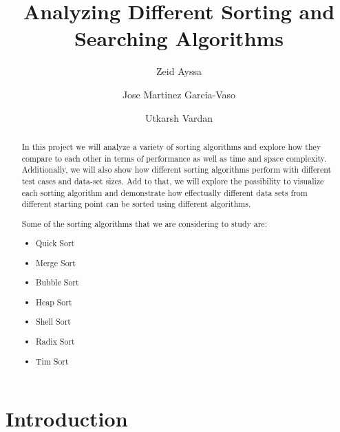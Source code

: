 \documentclass[sigconf,table]{acmart}
\begin{document}
\title{Analyzing Different Sorting and Searching Algorithms}

\author{Zeid Ayssa}

\author{Jose Martinez Garcia-Vaso}

\author{Utkarsh Vardan}

\begin{abstract}
In this project we will analyze a variety of sorting algorithms and explore how they compare to each other in terms of performance as well as time and space complexity. Additionally, we will also show how different sorting algorithms perform with different test cases and data-set sizes. Add to that, we will explore the possibility to visualize each sorting algorithm and demonstrate how effectually different data sets from different starting point can be sorted using different algorithms.

Some of the sorting algorithms that we are considering to study are:
\begin{itemize}
  \item Quick Sort
  \item Merge Sort
  \item Bubble Sort
  \item Heap Sort
  \item Shell Sort
  \item Radix Sort
  \item Tim Sort
\end{itemize}


\end{abstract}

\maketitle

\section{Introduction}

\end{document}
